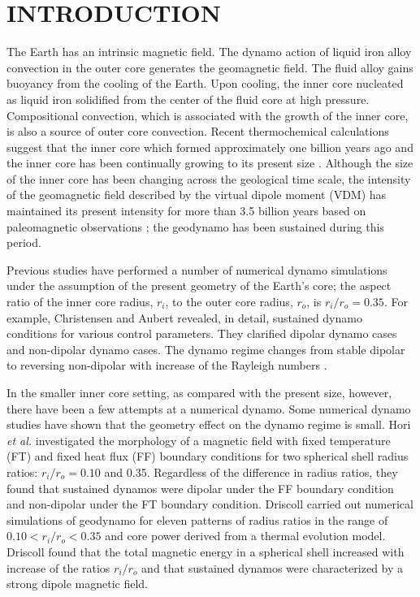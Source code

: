 \section{INTRODUCTION}
The Earth has an intrinsic magnetic field. The dynamo action of liquid iron alloy convection in the outer core generates the geomagnetic field. The fluid alloy gains buoyancy from the cooling of the Earth. Upon cooling, the inner core nucleated as liquid iron solidified from the center of the fluid core at high pressure. Compositional convection, which is associated with the growth of the inner core, is also a source of outer core convection. Recent thermochemical calculations suggest that the inner core which formed approximately one billion years ago and the inner core has been continually growing to its present size \cite{Labrosse:2001}. Although the size of the inner core has been changing across the geological time scale, the intensity of the geomagnetic field described by the virtual dipole moment (VDM) has maintained its present intensity for more than 3.5 billion years based on paleomagnetic observations \cite{Biggin:2015}; the geodynamo has been sustained during this period.

Previous studies have performed a number of numerical dynamo simulations under the assumption of the present geometry of the Earth’s core; the aspect ratio of the inner core radius, $r_{i}$, to the outer core radius, $r_{o}$, is $r_{i} / r_{o} = 0.35$. For example, Christensen and Aubert 
revealed, in detail, sustained dynamo conditions for various control parameters. They clarified dipolar dynamo cases and non-dipolar dynamo cases. The dynamo regime changes from stable dipolar to reversing non-dipolar with increase of the Rayleigh numbers \cite{Kutzner:2002,Olson:2011}.

In the smaller inner core setting, as compared with the present size, however, there have been a few attempts at a numerical dynamo. Some numerical dynamo studies have shown that the geometry effect on the dynamo regime is small. Hori {\it et al.}  investigated the morphology of a magnetic field with fixed temperature (FT) and fixed heat flux (FF) boundary conditions for two spherical shell radius ratios:  $r_{i} / r_{o} = 0.10$ and 0.35. Regardless of the difference in radius ratios, they found that sustained dynamos were dipolar under the FF boundary condition and non-dipolar under the FT boundary condition. Driscoll  carried out numerical simulations of geodynamo for eleven patterns of radius ratios in the range of $0.10 < r_{i} / r_{o} < 0.35$ and core power derived from a thermal evolution model. Driscoll  found that the total magnetic energy in a spherical shell increased with increase of the ratios $r_{i} / r_{o}$ and that sustained dynamos were characterized by a strong dipole magnetic field.


